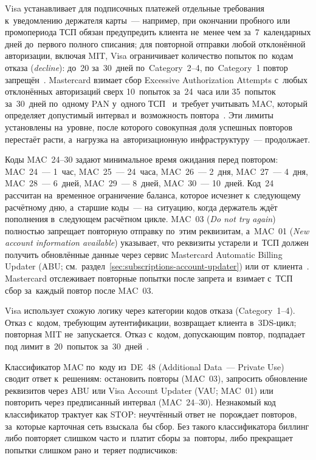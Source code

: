 Visa устанавливает для подписочных платежей отдельные требования к~уведомлению
держателя карты~--- например, при окончании пробного или промопериода ТСП
обязан предупредить клиента не~менее чем за~7~календарных дней до~первого
полного списания; для повторной отправки любой отклонённой авторизации,
включая MIT, Visa ограничивает количество попыток по~кодам отказа
(\textit{decline}): до~20 за~30~дней по~Category~2--4, по~Category~1 повтор
запрещён~\cite{visa-core-rules}. Mastercard взимает сбор Excessive
Authorization Attempts с~любых отклонённых авторизаций сверх 10~попыток
за~24~часа или 35~попыток за~30~дней по~одному PAN у~одного
ТСП~\cite{verisave-mc-rate-changes,paya-mc-excessive-auth} и~требует учитывать MAC, который определяет допустимый интервал
и~возможность повтора~\cite{mc-tpr}. Эти лимиты установлены на~уровне, после
которого совокупная доля успешных повторов перестаёт расти, а~нагрузка
на~авторизационную инфраструктуру~--- продолжает.

Коды MAC~24--30 задают минимальное время ожидания перед повтором: MAC~24~---
1~час, MAC~25~--- 24~часа, MAC~26~--- 2~дня, MAC~27~--- 4~дня, MAC~28~---
6~дней, MAC~29~--- 8~дней, MAC~30~--- 10~дней. Код~24 рассчитан на~временное
ограничение баланса, которое исчезнет к~следующему расчётному дню, а~старшие
коды~--- на~ситуацию, когда держатель ждёт пополнения в~следующем расчётном
цикле. MAC~03 (\textit{Do not try again}) полностью запрещает повторную
отправку по~этим реквизитам, а~MAC~01 (\textit{New account information
available}) указывает, что реквизиты устарели и~ТСП должен получить обновлённые
данные через сервис Mastercard Automatic Billing Updater (ABU;
см.~раздел~\ref{sec:subscriptions-account-updater}) или
от~клиента~\cite{mc-tpr,mc-abu,tabapay-mac}. Mastercard отслеживает повторные
попытки после запрета и~взимает с~ТСП сбор за~каждый повтор после
MAC~03.

Visa использует схожую логику через категории кодов отказа (Category~1--4).
Отказ с~кодом, требующим аутентификации, возвращает клиента в~3DS-цикл;
повторная MIT не~запускается. Отказ с~кодом, допускающим повтор, подпадает
под лимит в~20~попыток за~30~дней~\cite{visa-core-rules}.

Классификатор MAC по~коду из~DE~48 (Additional Data~--- Private Use) сводит ответ к~решениям: остановить повторы (MAC~03), запросить обновление
реквизитов через ABU или Visa Account Updater (VAU; MAC~01) или повторить через
предписанный интервал (MAC~24--30). Незнакомый код классификатор трактует
как STOP: неучтённый ответ не~порождает повторов, за~которые карточная сеть
взыскала~бы сбор. Без такого классификатора биллинг либо повторяет слишком часто
и~платит сборы за~повторы, либо прекращает попытки слишком
рано и~теряет подписчиков:

